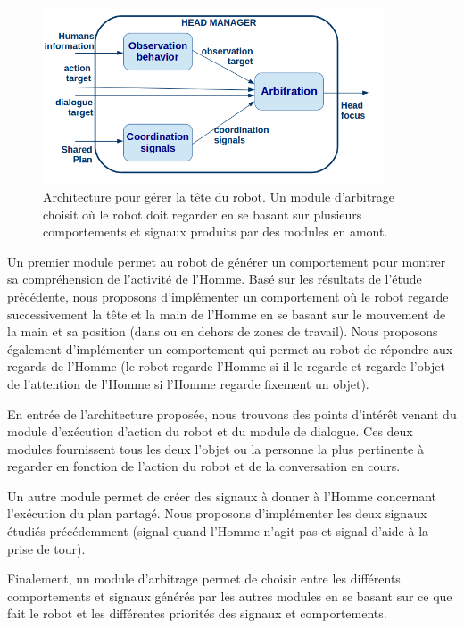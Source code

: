 \documentclass[english,a4paper,11pt,twoside]{StyleThese}
\begin{document}
\begin{figure}[!h]
	\centering
    \includegraphics[width=0.9\textwidth]{figs/Chapter6/Head_archi.png}
    \caption{Architecture pour gérer la tête du robot. Un module d'arbitrage choisit où le robot doit regarder en se basant sur plusieurs comportements et signaux produits par des modules en amont.}
    \label{fig:headArchi}
\end{figure}

Un premier module permet au robot de générer un comportement pour montrer sa compréhension de l'activité de l'Homme. Basé sur les résultats de l'étude précédente, nous proposons d'implémenter un comportement où le robot regarde successivement la tête et la main de l'Homme en se basant sur le mouvement de la main et sa position (dans ou en dehors de zones de travail). Nous proposons également d'implémenter un comportement qui permet au robot de répondre aux regards de l'Homme (le robot regarde l'Homme si il le regarde et regarde l'objet de l'attention de l'Homme si l'Homme regarde fixement un objet).

En entrée de l'architecture proposée, nous trouvons des points d’intérêt venant du module d’exécution d'action du robot et du module de dialogue. Ces deux modules fournissent tous les deux l'objet ou la personne la plus pertinente à regarder en fonction de l'action du robot et de la conversation en cours.

Un autre module permet de créer des signaux à donner à l'Homme concernant l'exécution du plan partagé. Nous proposons d'implémenter les deux signaux étudiés précédemment (signal quand l'Homme n'agit pas et signal d'aide à la prise de tour). 

Finalement, un module d'arbitrage permet de choisir entre les différents comportements et signaux générés par les autres modules en se basant sur ce que fait le robot et les différentes priorités des signaux et comportements.
\end{document}

